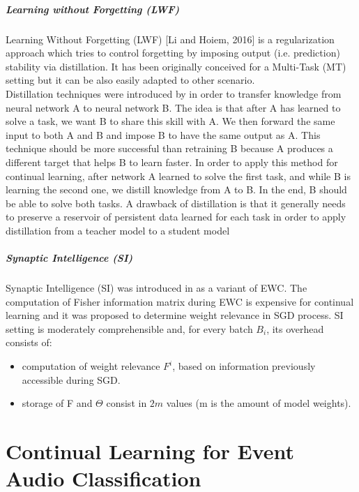 \documentclass[english, LaM, oneside]{sapthesis}%
\begin{document}
\subsubsection{Learning without Forgetting (LWF)}
Learning Without Forgetting (LWF) [Li and Hoiem, 2016] is a regularization approach which tries to control forgetting by imposing output (i.e. prediction) stability via distillation. It has been originally conceived for a Multi-Task (MT) setting but it can be also easily adapted to other scenario.
\\
Distillation techniques were introduced by \cite{distillation} in order to transfer knowledge from neural network A to neural network B. The idea is that after A has learned to solve a task, we want B to share this skill with A. We then forward the same input to both A and B and impose B to have the same output as A. This technique should be more successful than retraining B because A produces a different target that helps B to learn faster. In order to apply this method for continual learning, after network A learned to solve the first task, and while B is learning the second one, we distill knowledge from A to B. In the end, B should be able to solve both tasks. A drawback of distillation is that it generally needs to preserve a reservoir of persistent data learned for each task in order to apply distillation from a teacher model to a student model
\subsubsection{Synaptic Intelligence (SI)}
Synaptic Intelligence (SI) was introduced in \cite{zenke} as a variant of EWC. The computation of Fisher information matrix during EWC is expensive for continual learning and it was proposed to determine weight relevance in SGD process.
SI setting is moderately comprehensible and, for every batch $B_i$, its overhead consists of:
\begin{itemize}
    \item computation of weight relevance $F^i$, based on information previously accessible during SGD.
    \item storage of F and $\Theta$ consist in $2m$ values (m is the amount of model weights).
\end{itemize}



\part{Continual Learning for Event Audio Classification}
\end{document}
